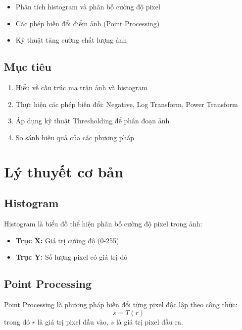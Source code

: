 \documentclass[12pt,a4paper]{article}
\begin{document}
\begin{itemize}
    \item Phân tích histogram và phân bố cường độ pixel
    \item Các phép biến đổi điểm ảnh (Point Processing)
    \item Kỹ thuật tăng cường chất lượng ảnh
\end{itemize}

\subsection{Mục tiêu}

\begin{enumerate}
    \item Hiểu về cấu trúc ma trận ảnh và histogram
    \item Thực hiện các phép biến đổi: Negative, Log Transform, Power Transform
    \item Áp dụng kỹ thuật Thresholding để phân đoạn ảnh
    \item So sánh hiệu quả của các phương pháp
\end{enumerate}

\section{Lý thuyết cơ bản}

\subsection{Histogram}

Histogram là biểu đồ thể hiện phân bố cường độ pixel trong ảnh:
\begin{itemize}
    \item \textbf{Trục X:} Giá trị cường độ (0-255)
    \item \textbf{Trục Y:} Số lượng pixel có giá trị đó
\end{itemize}

\subsection{Point Processing}

Point Processing là phương pháp biến đổi từng pixel độc lập theo công thức:
\[ s = T(r) \]
trong đó $r$ là giá trị pixel đầu vào, $s$ là giá trị pixel đầu ra.
\end{document}
